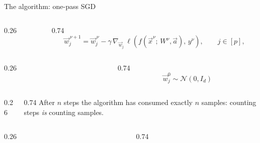 \documentclass[aspectratio=169,11pt]{beamer}
\begin{document}
\begin{frame}{The algorithm: one-pass SGD}
  \begin{columns}[c]
    \begin{column}{0.26\textwidth}\raggedleft{}\end{column}
    \begin{column}{0.74\textwidth}
      \[
        \vec{w}_j^{\,\nu+1} = \vec{w}_j^{\,\nu}
          - \gamma\,\nabla_{\vec{w}_j}\,
            \ell\!\left(f(\vec{x}^\nu;\, W^\nu, \vec{a}),\, y^\nu\right),
        \qquad j \in [p],
      \]
    \end{column}
  \end{columns}
  \vspace{-0.3em}
  \begin{center}
  \end{center}
  \vspace{0.8em}
  \begin{columns}[c]
    \begin{column}{0.26\textwidth}\raggedleft{}\end{column}
    \begin{column}{0.74\textwidth}
      \[ \vec{w}_j^0 \sim \mathcal{N}(0, I_d) \]
    \end{column}
  \end{columns}
  \vspace{0.8em}
  \begin{columns}[c]
    \begin{column}{0.26\textwidth}\raggedleft{}\end{column}
    \begin{column}{0.74\textwidth}
      After $n$ steps the algorithm has consumed exactly $n$ samples: counting
      steps \emph{is} counting samples.
    \end{column}
  \end{columns}
  \vspace{0.8em}
  \begin{columns}[c]
    \begin{column}{0.26\textwidth}\raggedleft{}\end{column}
    \begin{column}{0.74\textwidth}
    \end{column}
  \end{columns}
  \vfill
  \pause
  \begin{center}
    \quad
      

\end{center}
\end{frame}
\end{document}
